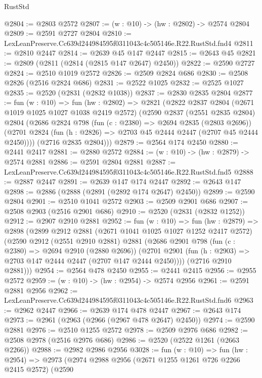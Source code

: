 \begin{lexlean}{RustStd}
\begin{coremodule}
@2804 := @2803 @2572
@2807 := (w : @10) -> (hw : @2802) -> @2574 @2804
@2809 := @2591 @2727 @2804
@2810 := LexLeanPreserve.Cc639d244984595f0311043c4c505146e.R22.RustStd.fnd4
@2811 := @2810 @2447
@2814 := @2639 @45 @147 @2447
@2815 := @2643 @45
@2821 := @2809 (@2811 (@2814 (@2815 @147 @2647) @2450))
@2822 := @2590 @2727
@2824 := @2510 @1019 @2572
@2826 := @2509 @2824 @686
@2830 := @2508 @2826 (@2516 @2824 @686)
@2831 := @2522 @1025
@2832 := @2525 @1027
@2835 := @2520 (@2831 (@2832 @1038))
@2837 := @2830 @2835 @2804
@2877 := fun (w : @10) =>
  fun (hw : @2802) =>
  @2821
    (@2822
      @2837
      @2804
      (@2671 @1019 @1025 @1027 @1038 @2419 @2572)
      (@2590
        @2837
        (@2551 @2835 @2804)
        @2804
        (@2686
          @2824
          @798
          (fun (c : @2380) => @2694 @2835 (@2803 @2696))
          (@2701 @2824 (fun (h : @2826) => @2703 @45 @2444 @2447 (@2707 @45 @2444 @2450))))
        (@2716 @2835 @2804)))
@2879 := @2564 @174 @2450
@2880 := @2441 @2417
@2881 := @2880 @2572
@2884 := (w : @10) -> (hw : @2879) -> @2574 @2881
@2886 := @2591 @2804 @2881
@2887 := LexLeanPreserve.Cc639d244984595f0311043c4c505146e.R22.RustStd.fnd5
@2888 := @2887 @2447
@2891 := @2639 @147 @174 @2447
@2892 := @2643 @147
@2898 := @2886 (@2888 (@2891 (@2892 @174 @2647) @2450))
@2899 := @2590 @2804
@2901 := @2510 @1041 @2572
@2903 := @2509 @2901 @686
@2907 := @2508 @2903 (@2516 @2901 @686)
@2910 := @2520 (@2831 (@2832 @1252))
@2912 := @2907 @2910 @2881
@2952 := fun (w : @10) =>
  fun (hw : @2879) =>
  @2898
    (@2899
      @2912
      @2881
      (@2671 @1041 @1025 @1027 @1252 @2417 @2572)
      (@2590
        @2912
        (@2551 @2910 @2881)
        @2881
        (@2686
          @2901
          @798
          (fun (c : @2380) => @2694 @2910 (@2880 @2696))
          (@2701 @2901 (fun (h : @2903) => @2703 @147 @2444 @2447 (@2707 @147 @2444 @2450))))
        (@2716 @2910 @2881)))
@2954 := @2564 @478 @2450
@2955 := @2441 @2415
@2956 := @2955 @2572
@2959 := (w : @10) -> (hw : @2954) -> @2574 @2956
@2961 := @2591 @2881 @2956
@2962 := LexLeanPreserve.Cc639d244984595f0311043c4c505146e.R22.RustStd.fnd6
@2963 := @2962 @2447
@2966 := @2639 @174 @478 @2447
@2967 := @2643 @174
@2973 := @2961 (@2963 (@2966 (@2967 @478 @2647) @2450))
@2974 := @2590 @2881
@2976 := @2510 @1255 @2572
@2978 := @2509 @2976 @686
@2982 := @2508 @2978 (@2516 @2976 @686)
@2986 := @2520 (@2522 @1261 (@2663 @2266))
@2988 := @2982 @2986 @2956
@3028 := fun (w : @10) =>
  fun (hw : @2954) =>
  @2973
    (@2974
      @2988
      @2956
      (@2671 @1255 @1261 @726 @2266 @2415 @2572)
      (@2590

\end{coremodule}
\end{lexlean}
